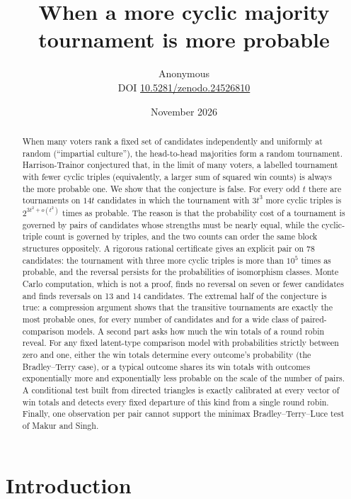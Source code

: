 \documentclass[11pt,a4paper]{article}
\title{\color{ink}\bfseries When a more cyclic majority tournament is more probable}
\author{Anonymous\\[3pt]{\small DOI \href{https://doi.org/10.5281/zenodo.24526810}{10.5281/zenodo.24526810}}}
\date{November 2026}
\theoremstyle{definition}
\begin{document}
\maketitle

\begin{abstract}
When many voters rank a fixed set of candidates independently and uniformly at random (``impartial culture''), the head-to-head majorities form a random tournament. Harrison-Trainor conjectured that, in the limit of many voters, a labelled tournament with fewer cyclic triples (equivalently, a larger sum of squared win counts) is always the more probable one. We show that the conjecture is false. For every odd $t$ there are tournaments on $14t$ candidates in which the tournament with $3t^3$ more cyclic triples is $2^{3t^2+o(t^2)}$ times as probable. The reason is that the probability cost of a tournament is governed by pairs of candidates whose strengths must be nearly equal, while the cyclic-triple count is governed by triples, and the two counts can order the same block structures oppositely. A rigorous rational certificate gives an explicit pair on 78 candidates: the tournament with three more cyclic triples is more than $10^5$ times as probable, and the reversal persists for the probabilities of isomorphism classes. Monte Carlo computation, which is not a proof, finds no reversal on seven or fewer candidates and finds reversals on 13 and 14 candidates. The extremal half of the conjecture is true: a compression argument shows that the transitive tournaments are exactly the most probable ones, for every number of candidates and for a wide class of paired-comparison models. A second part asks how much the win totals of a round robin reveal. For any fixed latent-type comparison model with probabilities strictly between zero and one, either the win totals determine every outcome's probability (the Bradley--Terry case), or a typical outcome shares its win totals with outcomes exponentially more and exponentially less probable on the scale of the number of pairs. A conditional test built from directed triangles is exactly calibrated at every vector of win totals and detects every fixed departure of this kind from a single round robin. Finally, one observation per pair cannot support the minimax Bradley--Terry--Luce test of Makur and Singh.
\end{abstract}

\section{Introduction}\label{sec:intro}
\end{document}
